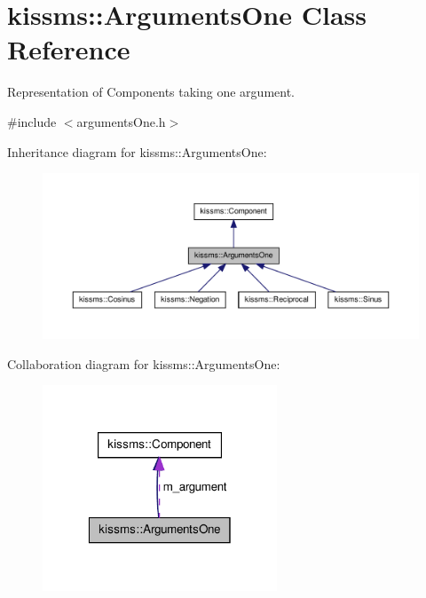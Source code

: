 \hypertarget{classkissms_1_1_arguments_one}{\section{kissms\-:\-:Arguments\-One Class Reference}
\label{classkissms_1_1_arguments_one}
}


Representation of Components taking one argument.  




{\ttfamily \#include $<$arguments\-One.\-h$>$}



Inheritance diagram for kissms\-:\-:Arguments\-One\-:
\nopagebreak
\begin{figure}[H]
\begin{center}
\leavevmode
\includegraphics[width=350pt]{classkissms_1_1_arguments_one__inherit__graph}
\end{center}
\end{figure}


Collaboration diagram for kissms\-:\-:Arguments\-One\-:
\nopagebreak
\begin{figure}[H]
\begin{center}
\leavevmode
\includegraphics[width=198pt]{classkissms_1_1_arguments_one__coll__graph}
\end{center}
\end{figure}
